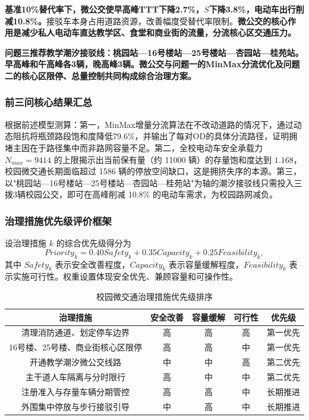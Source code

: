 \documentclass[UTF8,zihao=-4,a4paper]{ctexart}
\numberwithin{table}{section}
\numberwithin{figure}{section}
\numberwithin{equation}{section}
\begin{document}
\textbf{基准10\%替代率下，微公交使早高峰TTT下降2.7\%，$S$下降3.8\%，电动车出行削减10.8\%。}接驳车本身占用道路资源，改善幅度受替代率限制。\textbf{微公交的核心作用是减少私人电动车直达教学区、食堂和商业街的流量，分流核心区交通压力。}

\textbf{问题三推荐教学潮汐接驳线：桃园站—16号楼站—25号楼站—杏园站—桂苑站。早高峰和午高峰各3辆，晚高峰3辆。微公交与问题一的MinMax分流优化及问题二的核心区限停、总量控制共同构成综合治理方案。}

\subsubsection{前三问核心结果汇总}

根据前述模型测算：第一，MinMax增量分流算法在不改动道路的情况下，通过动态阻抗将瓶颈路段饱和度降低79.6\%，并输出了每对OD的具体分流路径，证明拥堵主因在于路径集中而非路网容量不足。第二，全校电动车安全承载力 $N_{max}=9414$ 的上限揭示出当前保有量（约 11000 辆）的存量饱和度达到 $1.168$，校园微交通长期面临超过 1586 辆的停放空间缺口，这是拥挤失序的本源。第三，以"桃园站—16号楼站—25号楼站—杏园站—桂苑站"为轴的潮汐接驳线只需投入三拨3辆校园公交，即可在高峰削减 10.8\% 的电动车需求，为校园路网减负。

\subsubsection{治理措施优先级评价框架}

设治理措施 $k$ 的综合优先级得分为
\begin{equation}
Priority_k=0.40Safety_k+0.35Capacity_k+0.25Feasibility_k,
\end{equation}
其中 $Safety_k$ 表示安全改善程度，$Capacity_k$ 表示容量缓解程度，$Feasibility_k$ 表示实施可行性。权重设置体现安全优先、兼顾容量和可操作性。

\begin{table}[H]
\footnotesize
\centering
\caption{校园微交通治理措施优先级排序}
\label{tab:priority_q4}
\begin{tabular}{ccccc}
\toprule
\textbf{治理措施} & \textbf{安全改善} & \textbf{容量缓解} & \textbf{可行性} & \textbf{优先级} \\
\midrule
清理消防通道、划定停车边界 & 高 & 高 & 高 & 第一优先 \\
16号楼、25号楼、商业街核心区限停 & 高 & 高 & 中 & 第一优先 \\
开通教学潮汐微公交线路 & 中 & 中 & 高 & 第二优先 \\
主干道人车隔离与分时限行 & 高 & 中 & 中 & 第二优先 \\
注册准入与存量车辆分期管控 & 高 & 高 & 中 & 长期推进 \\
外围集中停放与步行接驳引导 & 中 & 高 & 中 & 长期推进 \\
\bottomrule
\end{tabular}
\end{table}
\end{document}

